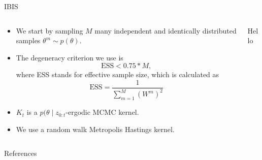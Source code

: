 \documentclass[10pt, aspectratio=1610]{beamer}
\begin{document}
    \begin{frame}{IBIS}
      \begin{columns}
        \begin{column}{0.5\textwidth}
          \begin{itemize}
            \item We start by sampling $M$ many independent and identically distributed samples $\theta^m \sim p(\theta)$.
            \item The degeneracy criterion we use is
              \begin{equation}
                \textrm{ESS} < 0.75 * M,
              \end{equation}
              where ESS stands for effective sample size, which is calculated as
              \begin{equation}
                \textrm{ESS} = \frac{1}{\sum_{m=1}^M (W^m)^2}
              \end{equation}
            \item $K_t$ is a $p(\theta \mid z_{0:t}$-ergodic MCMC kernel.
            \item We use a random walk Metropolis Hastings kernel.
          \end{itemize}
        \end{column}
        \begin{column}{0.5\textwidth}
          \begin{algorithm}[H]
            \SetAlgoLined
            \LinesNumbered
            \DontPrintSemicolon
          \end{algorithm}
        Hello
        \end{column}
      \end{columns}
    \end{frame}

  \begin{frame}[t, allowframebreaks]{References}
    
  \end{frame}
\end{document}
